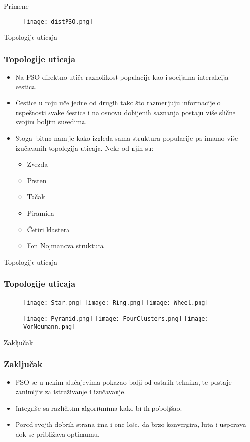 \documentclass{beamer}
\begin{document}
\begin{frame}{Primene}
\begin{figure}
\texttt{[image: distPSO.png]}
\end{figure}

\end{frame}



\begin{frame}{Topologije uticaja}
\frametitle{Topologije uticaja }
\begin{itemize}
    \item Na PSO direktno utiče raznolikost populacije kao i socijalna interakcija čestica.
    \item Čestice u roju uče jedne od drugih tako što razmenjuju informacije o uspešnosti svake čestice i na osnovu dobijenih saznanja postaju više slične svojim boljim susedima. 
    \item Stoga, bitno nam je kako izgleda sama struktura populacije pa imamo više izučavanih \alert{topologija uticaja}. Neke od njih su:
    \begin{itemize}
        \item Zvezda
        \item Prsten
        \item Točak
        \item Piramida
        \item Četiri klastera
        \item Fon Nojmanova struktura
    \end{itemize}

\end{itemize}
\end{frame}

\begin{frame}{Topologije uticaja}
\frametitle{Topologije uticaja}
\begin{figure}
\texttt{[image: Star.png]}
\texttt{[image: Ring.png]}
\texttt{[image: Wheel.png]}
\end{figure}

\begin{figure}
\texttt{[image: Pyramid.png]}
\texttt{[image: FourClusters.png]}
\texttt{[image: VonNeumann.png]}
\end{figure}

\end{frame}

\begin{frame}{Zaključak}
\frametitle{Zaključak}
    \begin{itemize}
        \item PSO se u nekim slučajevima pokazao bolji od ostalih tehnika, te postaje zanimljiv za istraživanje i izučavanje.
        \item Integriše sa različitim algoritmima kako bi ih poboljšao.   
        \item Pored svojih dobrih strana ima i one loše, da brzo konvergira, luta i usporava dok se približava optimumu.
    \end{itemize}
\end{frame}
\end{document}

